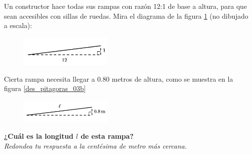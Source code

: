\question[15]  Un constructor hace todas sus rampas con razón 12:1 de base a altura,
para que sean accesibles con sillas de ruedas.
Mira el diagrama de la figura \ref{fig:des_pitagoras_03a} (no dibujado a escala):
\begin{figure}[H]
    \begin{center}
        \includegraphics[width=0.4\textwidth]{../images/des_pitagoras_03a.png}
    \end{center}
    \caption{}
    \label{fig:des_pitagoras_03a}
\end{figure}
Cierta rampa necesita llegar a 0.80 metros de altura, como se muestra en la figura \ref{des_pitagoras_03b}
\begin{figure}[H]
    \begin{center}
        \includegraphics[width=0.4\textwidth]{../images/des_pitagoras_03b.png}
    \end{center}
    \caption{}
    \label{fig:des_pitagoras_03b}
\end{figure}
\textbf{¿Cuál es la longitud $l$ de esta rampa?}\\
\textit{Redondea tu respuesta a la centésima de metro más cercana.}